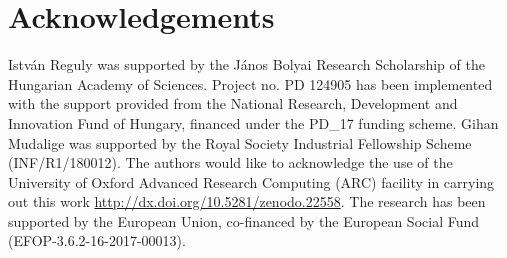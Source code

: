 \documentclass[number]{elsarticle}
\begin{document}
\section*{Acknowledgements}
\noindent Istv\'an Reguly was supported by the J\'anos Bolyai Research 
Scholarship of the Hungarian Academy of Sciences. Project no. PD 124905 has been 
implemented with the support provided from the National Research, Development 
and Innovation Fund of Hungary, financed under the PD\_17 funding scheme. Gihan 
Mudalige was supported by the Royal Society Industrial Fellowship Scheme 
(INF/R1/180012). The authors would like to acknowledge the use of the University 
of Oxford Advanced Research Computing (ARC) facility in carrying out this work 
\url{http://dx.doi.org/10.5281/zenodo.22558}. The research has been supported 
by the European Union, co-financed by the European Social Fund 
(EFOP-3.6.2-16-2017-00013).
%
%



%


% 
% 
\end{document}
